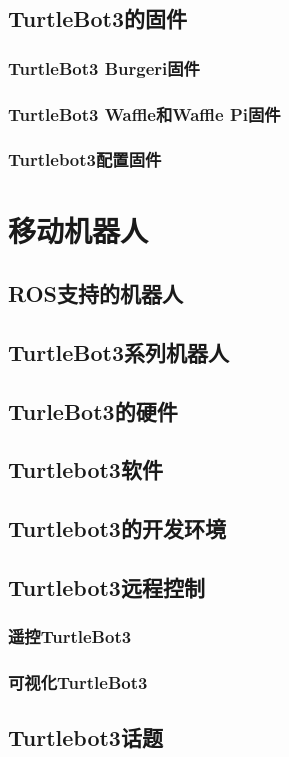\documentclass[geye,green,kindle,cn]{elegantnote}
\begin{document}
\subsection{TurtleBot3的固件}
\subsubsection{TurtleBot3 Burgeri固件}
\subsubsection{TurtleBot3 Waffle和Waffle Pi固件}
\subsubsection{Turtlebot3配置固件}
\section{移动机器人}
\subsection{ROS支持的机器人}
\subsection{TurtleBot3系列机器人}
\subsection{TurleBot3的硬件}
\subsection{Turtlebot3软件}
\subsection{Turtlebot3的开发环境}
\subsection{Turtlebot3远程控制}
\subsubsection{遥控TurtleBot3}
\subsubsection{可视化TurtleBot3}
\subsection{Turtlebot3话题}
\end{document}
